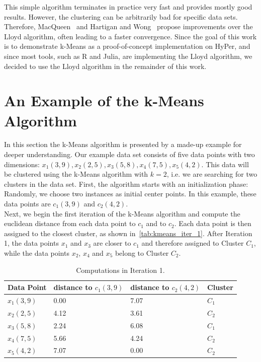 This simple algorithm terminates in practice very fast and provides mostly good results. However, the clustering can be arbitrarily bad for specific data sets. Therefore, MacQueen~\parencite{macqueen1967some} and Hartigan and Wong~\parencite{hartigan1979algorithm} propose improvements over the Lloyd algorithm, often leading to a faster convergence. Since the goal of this work is to demonstrate k-Means as a proof-of-concept implementation on HyPer, and since most tools, such as R and Julia, are implementing the Lloyd algorithm, we decided to use the Lloyd algorithm in the remainder of this work. 

\section{An Example of the k-Means Algorithm}

In this section the k-Means algorithm is presented by a made-up example for deeper understanding. Our example data set consists of five data points with two dimensions: $x_1(3,9), x_2(2,5), x_3(5,8), x_4(7,5), x_5(4,2)$. This data will be clustered using the k-Means algorithm with $k = 2$, i.e. we are searching for two clusters in the data set. First, the algorithm starts with an initialization phase: Randomly, we choose two instances as initial center points. In this example, these data points are $c_1(3,9)$ and $c_2(4,2)$. 
\\
Next, we begin the first iteration of the k-Means algorithm and compute the euclidean distance from each data point to $c_1$ and to $c_2$. Each data point is then assigned to the closest cluster, as shown in~\autoref{tab:kmeans_iter_1}. After Iteration 1, the data points $x_1$ and $x_3$ are closer to $c_1$ and therefore assigned to Cluster $C_1$, while the data points $x_2$, $x_4$ and $x_5$ belong to Cluster $C_2$.

\begin{table}[htsb]
\caption[Computations in Iteration 1]{Computations in Iteration 1.}\label{tab:kmeans_iter_1}
\centering
\begin{tabular}{l l l l}
\toprule
  Data Point & distance to $c_1(3,9)$ & distance to $c_2(4,2)$ & Cluster \\
\midrule
    $x_1(3,9)$ & 0.00 & 7.07 & $C_1$ \\
    $x_2(2,5)$ & 4.12 & 3.61 & $C_2$ \\
    $x_3(5,8)$ & 2.24 & 6.08 & $C_1$ \\
    $x_4(7,5)$ & 5.66 & 4.24 & $C_2$ \\
    $x_5(4,2)$ & 7.07 & 0.00 & $C_2$ \\
\bottomrule
\end{tabular}
\end{table}

